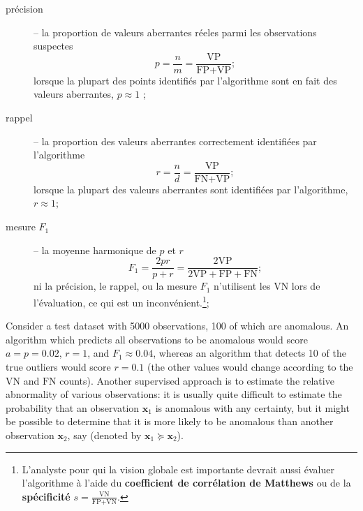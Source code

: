 \begin{description}
\item[pr\'ecision]-- la proportion de valeurs aberrantes r\'eeles parmi les observations suspectes $$p=\frac{n}{m}=\frac{\text{VP}}{\text{FP}+\text{VP}};$$ lorsque la plupart des points identifiés par l'algorithme sont en fait des valeurs aberrantes, $p\approx 1$ ;
\item[rappel]-- la proportion des valeurs aberrantes correctement identifi\'ees par l'algorithme
$$r=\frac{n}{d}=\frac{\text{VP}}{\text{FN}+\text{VP}};$$ lorsque la plupart des valeurs aberrantes sont identifi\'ees par l'algorithme, $r\approx 1$;
\item[mesure $F_1$]-- la moyenne harmonique de $p$ et $r$ 
$$F_1=\frac{2pr}{p+r}=\frac{2\text{VP}}{2\text{VP}+\text{FP}+\text{FN}};$$ ni la précision, le rappel, ou la mesure $F_1$ n'utilisent les $\text{VN}$ lors de l'évaluation, ce qui est un inconv\'enient.\footnote{L'analyste pour qui la vision globale est importante devrait aussi évaluer l'algorithme à l'aide du \textbf{coefficient de corrélation de Matthews} \cite{W_MCC} ou de la \textbf{sp\'ecificit\'e} $s=\frac{\text{VN}}{\text{FP}+\text{VN}}$.};
\end{description}
Consider a test dataset with 5000 ob\-ser\-va\-tions, 100 of which are anomalous. An algorithm which predicts all ob\-ser\-va\-tions to be anomalous would score $a=p=0.02$, $r=1$, and $F_1\approx 0.04$, whereas an algorithm that detects 10 of the true outliers would score $r=0.1$ (the other values would change according to the $\text{VN}$ and $\text{FN}$ counts).
\newpage \noindent Another supervised approach is to estimate the relative abnormality of various ob\-ser\-va\-tions: it is usually quite difficult to estimate the probability that an ob\-ser\-va\-tion $\mathbf{x}_1$ is anomalous with any certainty, but it might be possible to determine that it is more likely to be anomalous than another ob\-ser\-va\-tion $\mathbf{x}_2$, say (denoted by $\mathbf{x}_1\succeq \mathbf{x}_2$). %
